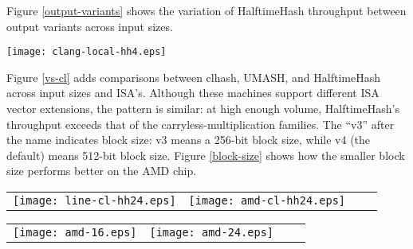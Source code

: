 \documentclass[sigconf, nonacm]{acmart}
\begin{document}
Figure \ref{output-variants} shows the variation of HalftimeHash throughput between output variants across input sizes.

\texttt{[image: clang-local-hh4.eps]}

Figure \ref{vs-cl} adds comparisons between clhash, UMASH, and HalftimeHash across input sizes and ISA's.
Although these machines support different ISA vector extensions, the pattern is similar: at high enough volume, HalftimeHash's throughput exceeds that of the carryless-multiplication families.
The ``v3'' after the name indicates block size: v3 means a 256-bit block size, while v4 (the default) means 512-bit block size.
Figure \ref{block-size} shows how the smaller block size performs better on the AMD chip.

\begin{figure*}
\begin{tabular}{cccc}
\texttt{[image: line-cl-hh24.eps]}
&
\texttt{[image: amd-cl-hh24.eps]}
\end{tabular}
\caption{
  \label{vs-cl}
  Comparison of Intel (i7-7800x) and AMD (EC2 c5a.large, 7R32 chip) performance.
  These AMD chips do not support AVX-512, but still HalftimeHash with 256-bit registers exceeds the speed of clmul-based hashing methods by up to a factor of 2 on long strings.
  In both cases, for long strings, HalftimeHash with 24 bytes of output is faster than clhash and UMASH.
  HalftimeHash24 also has lower collision probability.
  For long strings, the incremental cost of hashing the 24 bytes down to 8 with tabulation hashing is insignificant.
}
\end{figure*}

\begin{figure*}
\begin{tabular}{cccc}
\texttt{[image: amd-16.eps]}
&
\texttt{[image: amd-24.eps]}
\end{tabular}
\caption{
  \label{block-size}
  AMD performance.
  AMD chips do not have AVX-512 instructions, so blocks of that size are simulated with 2 AVX2 registers.
  Using a block size of 256 bits performs better.}
\end{figure*}
\end{document}
